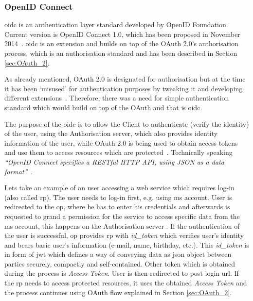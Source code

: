 \subsubsection{OpenID Connect}

\acrfull{oidc} is an authentication layer standard developed by OpenID Foundation. Current version is OpenID Connect 1.0, which has been proposed in November 2014~\cite{Sakimura2014Final:1}. \acrshort{oidc} is an extension and builds on top of the OAuth 2.0’s authorisation process, which is an authorisation standard and has been described in Section \ref{sec:OAuth_2}. 

As already mentioned, OAuth 2.0 is designated for authorisation but at the time it has been ‘misused’ for authentication purposes by tweaking it and developing different extensions~\cite{RicherUser2.0}. Therefore, there was a need for simple authentication standard which would build on top of the OAuth and that is \acrshort{oidc}.

The purpose of the \acrshort{oidc} is to allow the Client to authenticate (verify the identity) of the user, using the Authorisation server, which also provides identity information of the user, while OAuth 2.0 is being used to obtain access tokens and use them to access resources which are protected~\cite{OpenIDSpecs}. Technically speaking \textit{“OpenID Connect specifies a RESTful HTTP API, using JSON as a data format”}~\cite{OpenIDSpecs}.

Lets take an example of an user accessing a web service which requires log-in (also called \acrfull{rp}). The user needs to log-in first, e.g. using \acrfull{ms} account. User is redirected to the \acrfull{op}, where he has to enter his credentials and afterwards is requested to grand a permission for the service to access specific data from the \acrshort{ms} account, this happens on the Authorisation server
. If the authentication of the user is successful, \acrshort{op} provides \acrfull{rp} with \textit{id\_token} which verifies user’s identity and bears basic user’s information (e-mail, name, birthday, etc.). This \textit{id\_token} is in form of \acrfull{jwt} which defines a way of conveying data as \acrshort{json} object between parties securely, compactly and self-contained. Other token which is obtained during the process is \textit{Access Token}. User is then redirected to post login \acrshort{url}. If the  \acrshort{rp} needs to access protected resources, it uses the obtained \textit{Access Token} and the process continues using OAuth flow explained in Section \ref{sec:OAuth_2}.